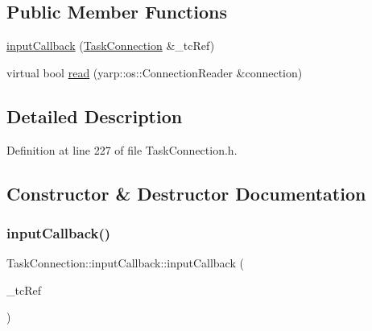 \subsection*{Public Member Functions}
\begin{DoxyCompactItemize}
\item 
\hyperlink{classocra__recipes_1_1TaskConnection_1_1inputCallback_a98ccd226e21cf3e6547689739bc88c8d}{input\+Callback} (\hyperlink{classocra__recipes_1_1TaskConnection}{Task\+Connection} \&\+\_\+tc\+Ref)
\item 
virtual bool \hyperlink{classocra__recipes_1_1TaskConnection_1_1inputCallback_a6572ca3aa11c347ecd414ea760ae89bc}{read} (yarp\+::os\+::\+Connection\+Reader \&connection)
\end{DoxyCompactItemize}


\subsection{Detailed Description}


Definition at line 227 of file Task\+Connection.\+h.



\subsection{Constructor \& Destructor Documentation}
\hypertarget{classocra__recipes_1_1TaskConnection_1_1inputCallback_a98ccd226e21cf3e6547689739bc88c8d}{}\label{classocra__recipes_1_1TaskConnection_1_1inputCallback_a98ccd226e21cf3e6547689739bc88c8d} 
\subsubsection{\texorpdfstring{input\+Callback()}{inputCallback()}}
{\footnotesize\ttfamily Task\+Connection\+::input\+Callback\+::input\+Callback (\begin{DoxyParamCaption}\item[{\hyperlink{classocra__recipes_1_1TaskConnection}{Task\+Connection} \&}]{\+\_\+tc\+Ref }\end{DoxyParamCaption})}




